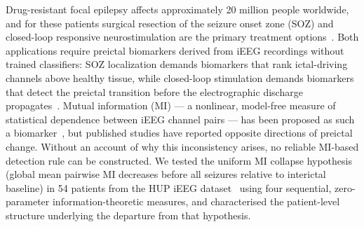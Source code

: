 \documentclass[final,5p,times,twocolumn]{elsarticle}
\begin{document}
Drug-resistant focal epilepsy affects approximately 20 million people
worldwide, and for these patients surgical resection of the seizure
onset zone (SOZ) and closed-loop responsive neurostimulation are the
primary treatment options~\cite{kwan2000,bergey2015}.
%
Both applications require preictal biomarkers derived from iEEG
recordings without trained classifiers: SOZ localization demands
biomarkers that rank ictal-driving channels above healthy tissue, while
closed-loop stimulation demands biomarkers that detect the preictal
transition before the electrographic discharge propagates~\cite{mormann2007}.
%
Mutual information (MI) --- a nonlinear, model-free measure of
statistical dependence between iEEG channel pairs --- has been proposed
as such a biomarker~\cite{schindler2008,kramer2012}, but published
studies have reported opposite directions of preictal change.
%
Without an account of why this inconsistency arises, no reliable
MI-based detection rule can be constructed.
%
We tested the uniform MI collapse hypothesis (global mean pairwise MI
decreases before all seizures relative to interictal baseline) in 54
patients from the HUP iEEG dataset~\cite{kini2016} using four
sequential, zero-parameter information-theoretic measures, and
characterised the patient-level structure underlying the departure from
that hypothesis.
\end{document}
